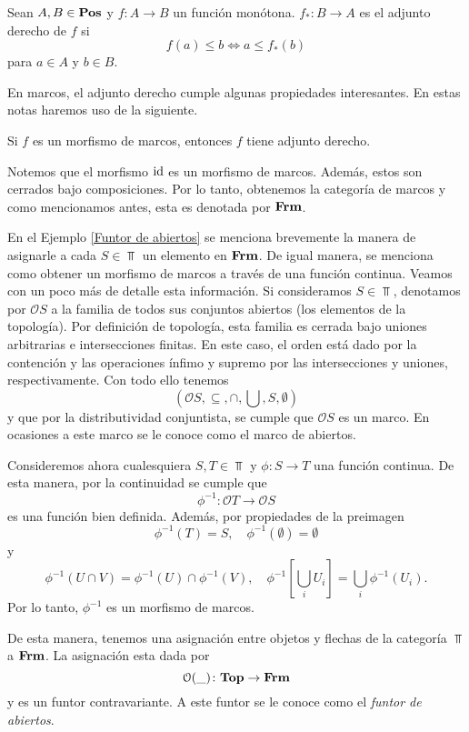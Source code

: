 \documentclass{comunicaciones}
\begin{document}
\begin{dfn}\label{Aiz}
    Sean $A, B\in \mathbf{Pos}$ y $f\colon A\to B$ un función monótona. $f_*\colon B\to A$ es el adjunto derecho de $f$ si 
    \[
    f(a)\leq b\Leftrightarrow a\leq f_*(b)
    \]
    para $a\in A$ y $b\in B$.
\end{dfn}

En marcos, el adjunto derecho cumple algunas propiedades interesantes. En estas notas haremos uso de la siguiente.

\begin{prop}
  Si $f$ es un morfismo de marcos, entonces $f$ tiene adjunto derecho.  
\end{prop}

Notemos que el morfismo $\mathrm{id}$ es un morfismo de marcos. Además, estos son cerrados bajo composiciones. Por lo tanto, obtenemos la categoría de marcos y como mencionamos antes, esta es denotada por $\mathbf{Frm}$.

En el Ejemplo \ref{Funtor de abiertos} se menciona brevemente la manera de asignarle a cada $S\in \Top$ un elemento en $\mathbf{Frm}$. De igual manera, se menciona como obtener un morfismo de marcos a través de una función continua. Veamos con un poco más de detalle esta información. Si consideramos $S\in \Top$, denotamos por $\mathcal{O}S$ a la familia de todos sus conjuntos abiertos (los elementos de la topología). Por definición de topología, esta familia es cerrada bajo uniones arbitrarias e intersecciones finitas. En este caso, el orden está dado por la contención y las operaciones ínfimo y supremo por las intersecciones y uniones, respectivamente. Con todo ello tenemos 
\[
(\mathcal{O}S, \subseteq, \cap, \bigcup, S, \emptyset)
\]
y que por la distributividad conjuntista, se cumple que $\mathcal{O}S$ es un marco. En ocasiones a este marco se le conoce como el marco de abiertos.

Consideremos ahora cualesquiera $S,T\in \Top$ y $\phi\colon S\to T$ una función continua. De esta manera, por la continuidad se cumple que
\[
\phi^{-1}\colon \mathcal{O}T\to\mathcal{O}S
\]
es una función bien definida. Además, por propiedades de la preimagen
\[
\phi^{-1}(T)=S,\quad \phi^{-1}(\emptyset)=\emptyset
\]
y
\[
\phi^{-1}(U\cap V)=\phi^{-1}(U)\cap \phi^{-1}(V),\quad \phi^{-1}[\bigcup_iU_i]=\bigcup_i\phi^{-1}(U_i).
\]
Por lo tanto, $\phi^{-1}$ es un morfismo de marcos.

De esta manera, tenemos una asignación entre objetos y flechas de la categoría $\Top$ a $\mathbf{Frm}$. La asignación esta dada por
\[
\mathcal{O} ( \_ )\colon \mathbf{Top}\to \mathbf{Frm}
\]
y es un funtor contravariante. A este funtor se le conoce como el \emph{funtor de abiertos}.
\end{document}
